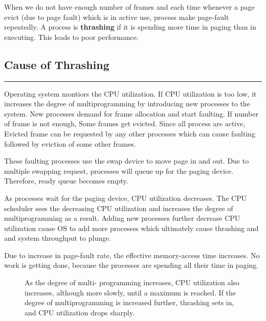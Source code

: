 \documentclass[12pt,onecolumn]{IEEEtran}
\begin{document}
When we do not have enough number of frames and each time whenever a page evict (due to page fault) which is in active use, process make page-fault repeatedly. A process is \textbf{thrashing} if it is spending more time in paging than in executing. This leads to poor performance.  

\subsection{Cause of Thrashing}
\hrule
\vspace{3mm}

Operating system montiors the CPU utilization. If CPU utilization is too low, it increases the degree of multiprogramming by introducing new processes to the system. New processes demand for frame allocation and start faulting. If number of frame is not enough, Some frames get evicted. Since all process are active, Evicted frame can be requested by any other processes which can cause faulting followed by eviction of some other frames.
\vspace{3mm}

These faulting processes use the swap device to move page in and out. Due to multiple swapping request, processes will queue up for the paging device. Therefore, ready queue becomes empty. 
\vspace{3mm}

As processes wait for the paging device, CPU utilization decreases. The CPU scheduler sees the decreasing CPU utilization and increases the degree of multiprogramming as a result. Adding new processes further decrease CPU utilization cause OS to add more processes which ultimately cause thrashing and and system throughput to plunge. 
\vspace{3mm}

Due to increase in page-fault rate, the effective memory-access time increases. No work is getting done, because the processes are spending all their time in paging. 
\begin{figure}[H]
	\centering
	\caption{ As the degree of multi-
	programming increases, CPU utilization also increases, although more slowly,
	until a maximum is reached. If the degree of multiprogramming is increased
	further, thrashing sets in, and CPU utilization drops sharply.}
\end{figure}
\end{document}
